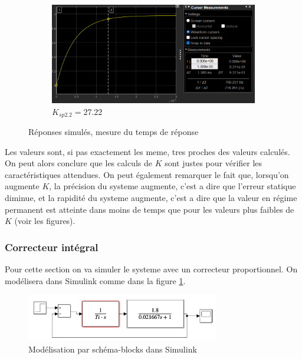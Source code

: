 \documentclass[12pt, a4paper]{report}
\begin{document}
\begin{figure}[H]
\begin{subfigure}[h!]{0.4\linewidth}
    \end{subfigure}
    \hfill
    \begin{subfigure}[h!]{0.4\linewidth}
        \includegraphics[width=\linewidth]{s1simk27tr.png}
        \caption{$K_{sp2.2} = 27.22$}
    \end{subfigure}
    \caption{Réponses simulés, mesure du temps de réponse}
\end{figure}

Les valeurs sont, si pas exactement les meme, tres proches des valeurs calculés. On peut alors
conclure que les calculs de $K$ sont justes pour vérifier les caractéristiques attendues. On peut également remarquer
le fait que, lorsqu'on augmente $K$, la précision du systeme augmente, c'est a dire que l'erreur statique
diminue, et la rapidité du systeme augmente, c'est a dire que la valeur en régime permanent est atteinte dans moins de temps
que pour les valeurs plus faibles de $K$ (voir les figures).

\subsubsection{Correcteur intégral}

Pour cette section on va simuler le systeme avec un correcteur proportionnel. On modélisera dans Simulink
comme dans la figure \ref{fig:schemablocksim2}.

\begin{figure}[h]
    \centering
    \includegraphics[width=0.75\textwidth]{schemasimulink2.png}
    \caption{Modélisation par schéma-blocks dans Simulink}
    \label{fig:schemablocksim2}
\end{figure}
\end{document}
